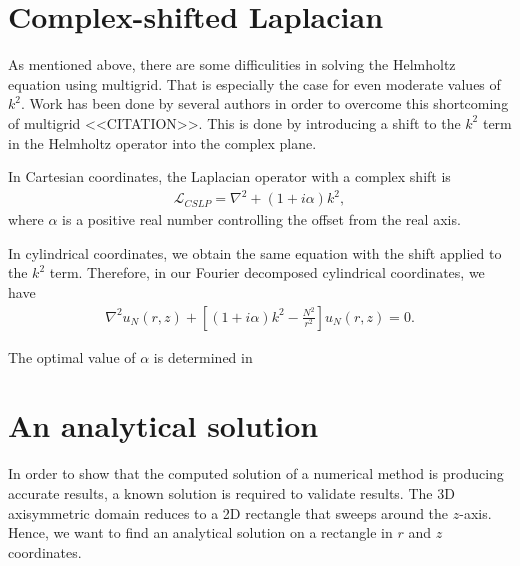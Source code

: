 
\section{Complex-shifted Laplacian}

As mentioned above, there are some difficulities in solving the Helmholtz equation using multigrid.
That is especially the case for even moderate values of $k^2$.
Work has been done by several authors in order to overcome this shortcoming of multigrid <<CITATION>>.
This is done by introducing a shift to the $k^2$ term in the Helmholtz operator into the complex plane.

In Cartesian coordinates, the Laplacian operator with a complex shift is
\begin{align}
	\mathcal{L}_{CSLP} = \nabla^2 + (1 + i \alpha ) k^2,  \label{eqn:cslp}
\end{align}
where $\alpha$ is a positive real number controlling the offset from the real axis.

In cylindrical coordinates, we obtain the same equation with the shift applied to the $k^2$ term.
Therefore, in our Fourier decomposed cylindrical coordinates, we have
\begin{align}
	\nabla^2 u_N(r,z) + \left[ \left( 1 + i \alpha \right) k^2 - \frac{N^2}{r^2} \right] u_N(r,z) = 0.
\end{align}


The optimal value of $\alpha$ is determined in \cite{cslp2}












\section{An analytical solution}

In order to show that the computed solution of a numerical method is producing accurate results, a known solution is required to validate results.
The 3D axisymmetric domain reduces to a 2D rectangle that sweeps around the $z$-axis.
Hence, we want to find an analytical solution on a rectangle in $r$ and $z$ coordinates.

